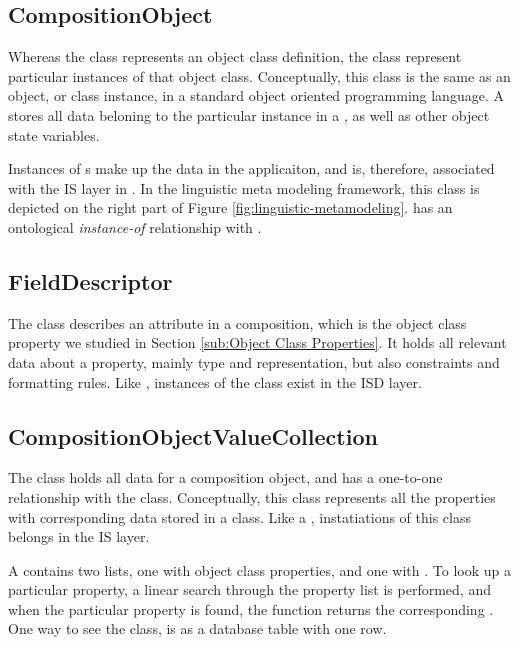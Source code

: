 \subsection{CompositionObject}
\label{sub:CompositionObject}
Whereas the  class represents an object class definition, the  class represent particular instances of that object class. Conceptually, this class is the same as an object, or class instance, in a standard object oriented programming language. A  stores all data beloning to the particular instance in a , as well as other object state variables.

Instances of s make up the data in the applicaiton, and is, therefore, associated with the IS layer in \mde. In the linguistic meta modeling framework, this class is depicted on the right part of Figure \ref{fig:linguistic-metamodeling}.  has an ontological \textit{instance-of} relationship with .

\subsection{FieldDescriptor}
\label{sub:FieldDescriptor}
The  class describes an attribute in a composition, which is the object class property we studied in Section \ref{sub:Object Class Properties}. It holds all relevant data about a property, mainly type and representation, but also constraints and formatting rules. Like , instances of the  class exist in the ISD layer.

\subsection{CompositionObjectValueCollection}
\label{sub:CompositionObjectValueCollection}
The  class holds all data for a composition object, and has a one-to-one relationship with the  class. Conceptually, this class represents all the properties with corresponding data stored in a class. Like a , instatiations of this class belongs in the IS layer.

A  contains two lists, one with object class properties, and one with . To look up a particular property, a linear search through the property list is performed, and when the particular property is found, the function returns the corresponding . One way to see the  class, is as a database table with one row.


